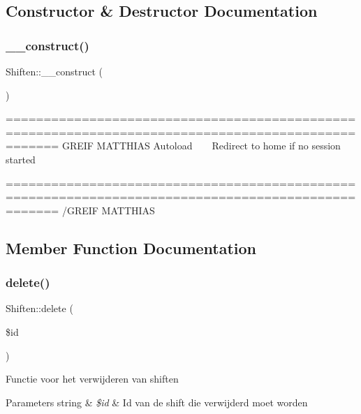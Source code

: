 \subsection{Constructor \& Destructor Documentation}
\mbox{\label{class_shiften_ab8a8594268fd644b65cbc27698fd94f4}} 
\subsubsection{\texorpdfstring{\+\_\+\+\_\+construct()}{\_\_construct()}}
{\footnotesize\ttfamily Shiften\+::\+\_\+\+\_\+construct (\begin{DoxyParamCaption}{ }\end{DoxyParamCaption})}

=================================================================================================== G\+R\+E\+IF M\+A\+T\+T\+H\+I\+AS Autoload ~\newline
~\newline
 Redirect to home if no session started

=================================================================================================== /\+G\+R\+E\+IF M\+A\+T\+T\+H\+I\+AS 

\subsection{Member Function Documentation}
\mbox{\label{class_shiften_a68ff1255b0af39c545eae586c3fac0b8}} 
\subsubsection{\texorpdfstring{delete()}{delete()}}
{\footnotesize\ttfamily Shiften\+::delete (\begin{DoxyParamCaption}\item[{}]{\$id }\end{DoxyParamCaption})}

Functie voor het verwijderen van shiften 
\begin{DoxyParams}[1]{Parameters}
string & {\em \$id} & Id van de shift die verwijderd moet worden \\
\hline
\end{DoxyParams}
\mbox{\label{class_shiften_af783a05fca5d9fe438122482ce10ded8}} 
